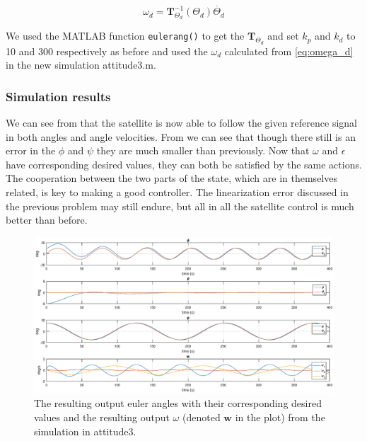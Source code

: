 \begin{equation}
    \omega_d = \mathbf{T}_{\Theta_d}^{-1}(\Theta_d)\dot{\Theta_d}
    \label{eq:omega_d}
\end{equation}

We used the MATLAB function \texttt{eulerang()} to get the $\mathbf{T}_{\Theta_d}$ and set $k_p$ and $k_d$ to 10 and 300 respectively as before and used the $\omega_d$ calculated from \eqref{eq:omega_d} in the new simulation {\color{blue} attitude3.m}.

\subsubsection*{Simulation results}

We can see from  that the satellite is now able to follow the given reference signal in both angles and angle velocities. From  we can see that though there still is an error in the $\phi$ and $\psi$ they are much smaller than previously. Now that $\omega$ and $\epsilon$ have corresponding desired values, they can both be satisfied by the same actions. The cooperation between the two parts of the state, which are in themselves related, is key to making a good controller. The linearization error discussed in the previous problem may still endure, but all in all the satellite control is much better than before.

\begin{figure}
	\centering
	\includegraphics[width=1.00\textwidth]{figures/3_euler.eps}
	\caption{The resulting output euler angles with their corresponding desired values and the resulting output $\omega$ (denoted $\mathbf{w}$ in the plot) from the simulation in attitude3.}
\label{fig:sim_attitude3_euler}
\end{figure}

